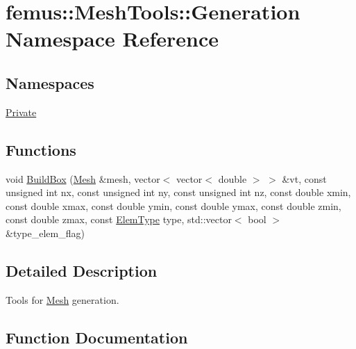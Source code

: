 \hypertarget{namespacefemus_1_1_mesh_tools_1_1_generation}{}\section{femus\+:\+:Mesh\+Tools\+:\+:Generation Namespace Reference}
\label{namespacefemus_1_1_mesh_tools_1_1_generation}
\subsection*{Namespaces}
\begin{DoxyCompactItemize}
\item 
 \mbox{\hyperlink{namespacefemus_1_1_mesh_tools_1_1_generation_1_1_private}{Private}}
\end{DoxyCompactItemize}
\subsection*{Functions}
\begin{DoxyCompactItemize}
\item 
void \mbox{\hyperlink{namespacefemus_1_1_mesh_tools_1_1_generation_a14f0397aa56aee31c9e6d679dfc28465}{Build\+Box}} (\mbox{\hyperlink{classfemus_1_1_mesh}{Mesh}} \&mesh, vector$<$ vector$<$ double $>$ $>$ \&vt, const unsigned int nx, const unsigned int ny, const unsigned int nz, const double xmin, const double xmax, const double ymin, const double ymax, const double zmin, const double zmax, const \mbox{\hyperlink{_elem_type_enum_8hpp_a1b014294b9757a001707c979e2bab627}{Elem\+Type}} type, std\+::vector$<$ bool $>$ \&type\+\_\+elem\+\_\+flag)
\end{DoxyCompactItemize}


\subsection{Detailed Description}
Tools for {\ttfamily \mbox{\hyperlink{classfemus_1_1_mesh}{Mesh}}} generation. 

\subsection{Function Documentation}
\mbox{\label{namespacefemus_1_1_mesh_tools_1_1_generation_a14f0397aa56aee31c9e6d679dfc28465}} 
